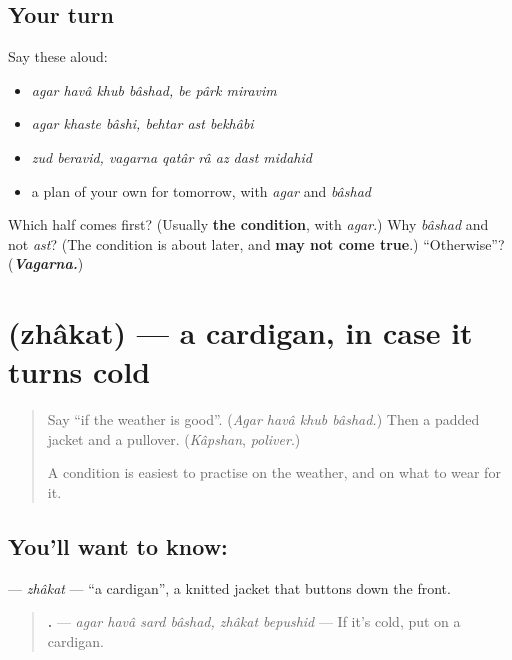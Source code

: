 \subsection*{Your turn}
Say these aloud:

\begin{itemize}
\raggedright
  \item \emph{agar havâ khub bâshad, be pârk miravim}
  \item \emph{agar khaste bâshi, behtar ast bekhâbi}
  \item \emph{zud beravid, vagarna qatâr râ az dast midahid}
  \item a plan of your own for tomorrow, with \emph{agar} and \emph{bâshad}
\end{itemize}

\begin{tcolorbox}[breakable,colback=teal!4,colframe=teal!35!black,title={Before you move on}]
Which half comes first? (Usually \textbf{the condition}, with \emph{agar}.) Why \emph{bâshad} and not \emph{ast}? (The condition is about later, and \textbf{may not come true}.) \textquotedblleft{}Otherwise\textquotedblright{}? (\emph{\textbf{Vagarna.}})
\end{tcolorbox}
\section[\texorpdfstring{\fa{ژاکت} (zhâkat)}{ژاکت (zhâkat)}]{ (zhâkat) — a cardigan, in case it turns cold}

\label{lesson:FA-C298-zhakat}



\begin{quote}
Say \textquotedblleft{}if the weather is good\textquotedblright{}. (\emph{Agar havâ khub bâshad.}) Then a padded jacket and a pullover. (\emph{Kâpshan}, \emph{poliver}.)

A condition is easiest to practise on the weather, and on what to wear for it.
\end{quote}

\subsection*{You'll want to know: }
\textbf{} — \emph{zhâkat} — \textquotedblleft{}a cardigan\textquotedblright{}, a knitted jacket that buttons down the front.

\begin{quote}
\textbf{     .} — \emph{agar havâ sard bâshad, zhâkat bepushid} — If it's cold, put on a cardigan.
\end{quote}

